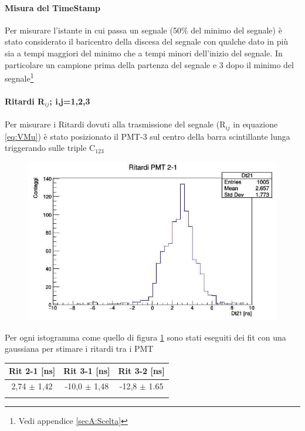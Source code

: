 \documentclass[a4paper]{article}
\begin{document}
\paragraph{Misura del TimeStamp}
Per misurare l'istante in cui passa un segnale (50$\%$ del minimo del segnale) è stato considerato il baricentro della discesa del segnale con qualche dato in più sia a tempi maggiori del minimo che a tempi minori dell'inizio del segnale. In particolare un campione prima della partenza del segnale e 3 dopo il minimo del segnale\footnote{Vedi appendice \ref{secA:Scelta}}

\paragraph{Ritardi R$_{ij}$; i,j=1,2,3}
Per misurare i Ritardi dovuti alla trasmissione del segnale (R$_{ij}$ in equazione \ref{eq:VMu}) è stato posizionato il PMT-3 sul centro della barra scintillante lunga triggerando sulle triple C$_{123}$

\begin{figure}[H]
\centering
\includegraphics[scale=0.3]{./immagini/TimeOfFlight/Rit21Fore.jpg}
\caption{}
\label{fig:Dt21Fore}
\end{figure}

Per ogni istogramma come quello di figura \ref{fig:Dt21Fore} sono stati eseguiti dei fit con una gaussiana per stimare i ritardi tra i PMT

\begin{tabular}{|c|c|c|}
\hline
Rit 2-1 [ns] & Rit 3-1 [ns] & Rit 3-2 [ns] \\
\hline
2,74 $\pm$ 1,42 & -10,0 $\pm$ 1,48 & -12,8 $\pm$ 1.65\\
\hline
\label{tab:RitFore}
\end{tabular}
\end{document}
